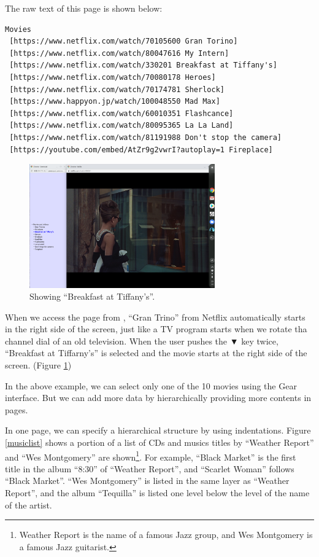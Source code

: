 \documentclass{article}
\def\down{▼}
\def\SC{\tsf{Serencast}}
\def\SB{\tsf{Scrapbox}}
\begin{document}
The raw text of this page is shown below:

{\scriptsize
\begin{verbatim}
Movies
 [https://www.netflix.com/watch/70105600 Gran Torino]
 [https://www.netflix.com/watch/80047616 My Intern]
 [https://www.netflix.com/watch/330201 Breakfast at Tiffany's]
 [https://www.netflix.com/watch/70080178 Heroes]
 [https://www.netflix.com/watch/70174781 Sherlock]
 [https://www.happyon.jp/watch/100048550 Mad Max]
 [https://www.netflix.com/watch/60010351 Flashcance]
 [https://www.netflix.com/watch/80095365 La La Land]
 [https://www.netflix.com/watch/81191988 Don't stop the camera]
 [https://youtube.com/embed/AtZr9g2vwrI?autoplay=1 Fireplace]
\end{verbatim}}

\begin{figure}[H]
\centerline{\includegraphics[width=80mm,bb=0 0 2400 1600]{figures/e8ae562a5a68a1955ac70b4faed9a146.png}}
\caption{Showing ``Breakfast at Tiffany's''.}
\label{tiffany}
\end{figure}

When we access the {\SB} page from {\SC},
``Gran Trino'' from Netflix automatically starts in the right side of the screen,
just like a TV program starts when we rotate tha channel dial of an old television.
When the user pushes the {\down} key twice,
``Breakfast at Tiffarny's'' is selected and
the movie starts at the right side of the screen. (Figure \ref{tiffany})

In the above example, we can select only one of the 10 movies using the Gear interface.
But we can add more data by hierarchically providing more contents in {\SB} pages.

In one page, we can specify a hierarchical structure by using indentations.
Figure \ref{musiclist} shows a portion of a list of CDs and
musics titles by ``Weather Report'' and ``Wes Montgomery'' are shown\footnote{
  Weather Report is the name of a famous Jazz group, and Wes Montgomery is a famous Jazz guitarist.
}.
For example, 
``Black Market'' is the first title in the album ``8:30'' of ``Weather Report'', and
``Scarlet Woman'' follows ``Black Market''.
``Wes Montgomery'' is listed in the same layer as ``Weather Report'', and
the album ``Tequilla'' is listed one level below the level of the name of the artist.
\end{document}
